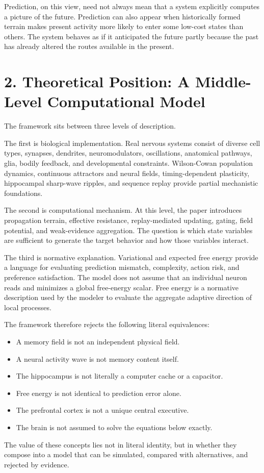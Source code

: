 \documentclass[11pt, a4paper]{article}
\begin{document}
Prediction, on this view, need not always mean that a system explicitly computes a picture of the future. Prediction can also appear when historically formed terrain makes present activity more likely to enter some low-cost states than others. The system behaves as if it anticipated the future partly because the past has already altered the routes available in the present.


\section{2. Theoretical Position: A Middle-Level Computational Model}

The framework sits between three levels of description.

The first is biological implementation. Real nervous systems consist of diverse cell types, synapses, dendrites, neuromodulators, oscillations, anatomical pathways, glia, bodily feedback, and developmental constraints. Wilson-Cowan population dynamics, continuous attractors and neural fields, timing-dependent plasticity, hippocampal sharp-wave ripples, and sequence replay provide partial mechanistic foundations.

The second is computational mechanism. At this level, the paper introduces propagation terrain, effective resistance, replay-mediated updating, gating, field potential, and weak-evidence aggregation. The question is which state variables are sufficient to generate the target behavior and how those variables interact.

The third is normative explanation. Variational and expected free energy provide a language for evaluating prediction mismatch, complexity, action risk, and preference satisfaction. The model does not assume that an individual neuron reads and minimizes a global free-energy scalar. Free energy is a normative description used by the modeler to evaluate the aggregate adaptive direction of local processes.

The framework therefore rejects the following literal equivalences:

\begin{itemize}
\item A memory field is not an independent physical field.
\item A neural activity wave is not memory content itself.
\item The hippocampus is not literally a computer cache or a capacitor.
\item Free energy is not identical to prediction error alone.
\item The prefrontal cortex is not a unique central executive.
\item The brain is not assumed to solve the equations below exactly.

\end{itemize}
The value of these concepts lies not in literal identity, but in whether they compose into a model that can be simulated, compared with alternatives, and rejected by evidence.
\end{document}
